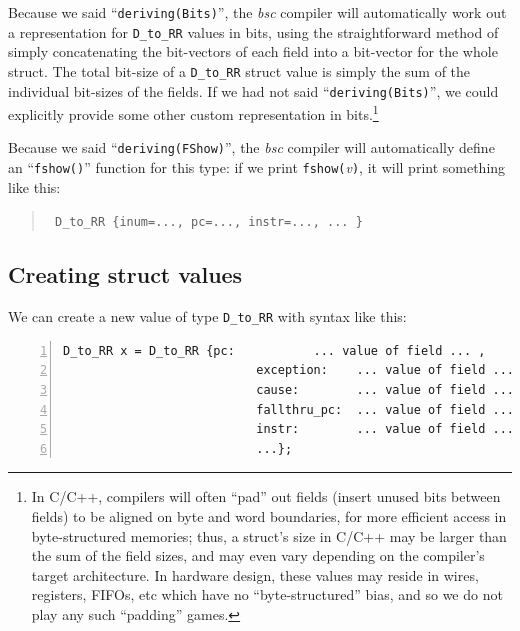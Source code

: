 Because we said ``\verb|deriving(Bits)|'', the \emph{bsc} compiler
will automatically work out a representation for \verb|D_to_RR| values
in bits, using the straightforward method of simply concatenating the
bit-vectors of each field into a bit-vector for the whole struct.  The
total bit-size of a \verb|D_to_RR| struct value is simply the sum of
the individual bit-sizes of the fields.  If we had not said
``\verb|deriving(Bits)|'', we could explicitly provide some other
custom representation in bits.\footnote{ In C/C++, compilers will
often ``pad'' out fields (insert unused bits between fields) to be
aligned on byte and word boundaries, for more efficient access in
byte-structured memories; thus, a struct's size in C/C++ may be larger
than the sum of the field sizes, and may even vary depending on the
compiler's target architecture.  In hardware design, these values may
reside in wires, registers, FIFOs, etc which have no
``byte-structured'' bias, and so we do not play any such ``padding''
games.}



Because we said ``\verb|deriving(FShow)|'', the \emph{bsc} compiler
will automatically define an ``\verb|fshow()|'' function for this
type: if we print \verb|fshow(|\emph{v}\verb|)|, it will print
something like this:

\begin{quote}\tt
D\_to\_RR \{inum=..., pc=..., instr=..., ... \}
\end{quote}


\subsection{Creating struct values}


We can create a new value of type \verb|D_to_RR| with syntax like
this:

\begin{Verbatim}[frame=single, numbers=left]
      D_to_RR x = D_to_RR {pc:           ... value of field ... ,
                           exception:    ... value of field ... ,
                           cause:        ... value of field ... ,
                           fallthru_pc:  ... value of field ... ,
                           instr:        ... value of field ... ,
                           ...};
\end{Verbatim}

